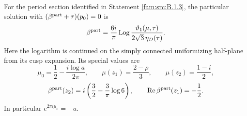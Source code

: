 \begin{proposition}\label{fam:src:C.1.1}\label{fam:st:C.1.1}
For the period section identified in Statement \ref{fam:src:B.1.3}, the particular solution
with \((\beta^{\rm part}+\tau)(p_0)=0\) is
\begin{equation}\label{fam:eq:cd-beta}
 \beta^{\rm part}=\frac{6i}{\pi}\operatorname{Log}
 \frac{\vartheta_1(\mu,\tau)}{2\sqrt3\,\eta_D(\tau)}.
\end{equation}
Here the logarithm is continued on the simply connected uniformizing
half-plane from its cusp expansion. Its special values are
\[
 \mu_0=\frac12-\frac{i\log a}{2\pi},\qquad
 \mu(z_1)=\frac{2-\rho}{3},\qquad \mu(z_2)=\frac{1-i}{2},
\]
\[
 \beta^{\rm part}(z_2)=i\left(\frac32-\frac3\pi\log6\right),
 \qquad \operatorname{Re}\beta^{\rm part}(z_1)=-\frac12.
\]
In particular \(e^{2\pi i\mu_0}=-a\).
\end{proposition}

